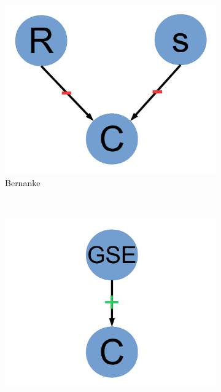 \documentclass[12pt]{article}
\begin{document}
\begin{figure}
        \centering
        \begin{subfigure}[b]{0.2\textwidth}
                \includegraphics[width=\textwidth]{bernanke.pdf}
                \caption{\footnotesize Bernanke}
                \label{fig:bernanke}
        \end{subfigure}%
        ~ %
        \begin{subfigure}[b]{0.2\textwidth}
                \includegraphics[width=\textwidth]{paulson.pdf}

\end{subfigure}
\end{figure}
\end{document}
